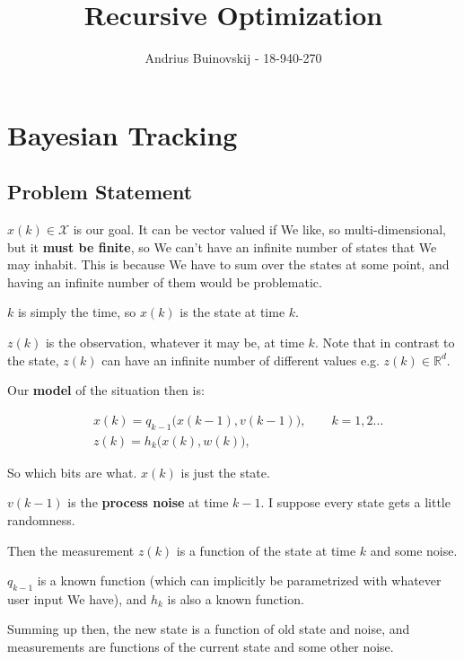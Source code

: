 \documentclass{article}
\begin{document}
\title{Recursive Optimization}
\author{Andrius Buinovskij - 18-940-270}
\date{}

\maketitle

\section{Bayesian Tracking}

	\subsection{Problem Statement}
	
		$x(k)\in\mathcal{X}$ is our goal. It can be vector valued if We like, so multi-dimensional, but it \textbf{must be finite}, so We can't have an infinite number of states that We may inhabit. This is because We have to sum over the states at some point, and having an infinite number of them would be problematic. 
		
		$k$ is simply the time, so $x(k)$ is the state at time $k$. 
		
		$z(k)$ is the observation, whatever it may be, at time $k$. Note that in contrast to the state, $z(k)$ can have an infinite number of different values e.g. $z(k)\in\mathbb{R}^d$.
		
		Our \textbf{model} of the situation then is:
		
		\begin{align*}
			& x(k) = q_{k-1}\big(x(k-1), v(k-1)\big),\qquad k=1, 2\ldots\\
			& z(k) = h_k\big(x(k), w(k)\big),
		\end{align*}
		
		So which bits are what. $x(k)$ is just the state. 
		
		$v(k-1)$ is the \textbf{process noise} at time $k-1$.  I suppose every state gets a little randomness.
		
		Then the measurement $z(k)$ is a function of the state at time $k$ and some noise.
		
		$q_{k-1}$ is a known function (which can implicitly be parametrized with whatever user input We have), and $h_k$ is also a known function.
		
		Summing up then, the new state is a function of old state and noise, and measurements are functions of the current state and some other noise.  
		
\end{document}
